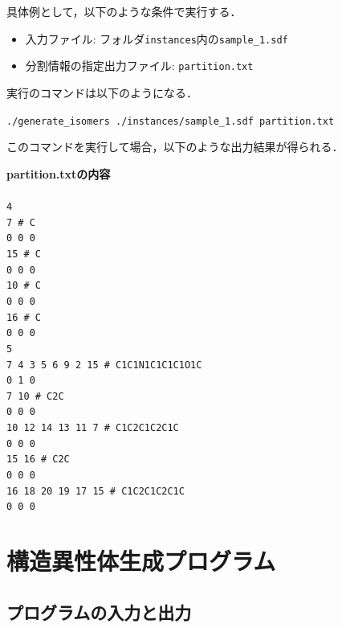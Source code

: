 \documentclass[11pt,titlepage,dvipdfmx,twoside]{jsbook}
\begin{document}
具体例として，以下のような条件で実行する．

\begin{itemize}
\item 入力ファイル: フォルダ{\tt instances}内の{\tt sample\_1.sdf}
\item 分割情報の指定出力ファイル: {\tt partition.txt}
\end{itemize}

実行のコマンドは以下のようになる．

\bigskip

{\tt ./generate\_isomers ./instances/sample\_1.sdf partition.txt}

\bigskip

このコマンドを実行して場合，以下のような出力結果が得られる．

\begin{oframed}
{\bf partition.txtの内容}\\\\
{\tt 4 \\
7 \# C \\
0 0 0 \\
15 \# C \\
0 0 0 \\
10 \# C \\
0 0 0 \\
16 \# C \\
0 0 0 \\
5 \\
7 4 3 5 6 9 2 15 \# C1C1N1C1C1C1O1C \\
0 1 0 \\
7 10 \# C2C \\
0 0 0 \\
10 12 14 13 11 7 \# C1C2C1C2C1C \\
0 0 0 \\
15 16 \# C2C \\
0 0 0 \\
16 18 20 19 17 15 \# C1C2C1C2C1C \\
0 0 0 \\}
\end{oframed}

\section{構造異性体生成プログラム}
\label{chap: main}

\subsection{プログラムの入力と出力}
\label{chap:InOut_m}
\end{document}
